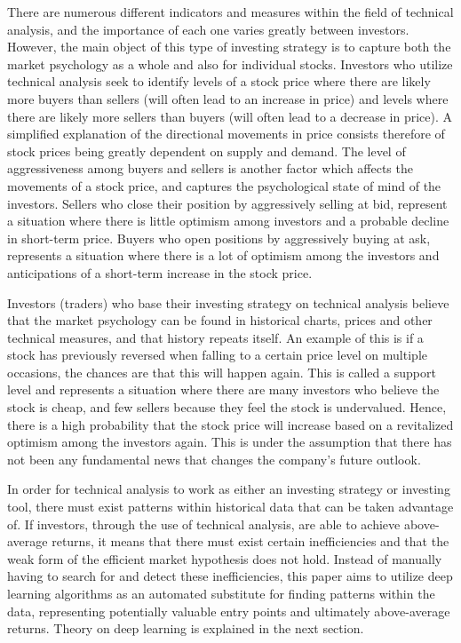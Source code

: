 \indent \newline 
There are numerous different indicators and measures within the field of technical analysis, and the importance of each one varies greatly between investors. However, the main object of this type of investing strategy is to capture both the market psychology as a whole and also for individual stocks. Investors who utilize technical analysis seek to identify levels of a stock price where there are likely more buyers than sellers (will often lead to an increase in price) and levels where there are likely more sellers than buyers (will often lead to a decrease in price). A simplified explanation of the directional movements in price consists therefore of stock prices being greatly dependent on supply and demand. The level of aggressiveness among buyers and sellers is another factor which affects the movements of a stock price, and captures the psychological state of mind of the investors. Sellers who close their position by aggressively selling at bid, represent a situation where there is little optimism among investors and a probable decline in short-term price. Buyers who open positions by aggressively buying at ask, represents a situation where there is a lot of optimism among the investors and anticipations of a short-term increase in the stock price. 

\indent \newline 
Investors (traders) who base their investing strategy on technical analysis believe that the market psychology can be found in historical charts, prices and other technical measures, and that history repeats itself. An example of this is if a stock has previously reversed when falling to a certain price level on multiple occasions, the chances are that this will happen again. This is called a support level and represents a situation where there are many investors who believe the stock is cheap, and few sellers because they feel the stock is undervalued. Hence, there is a high probability that the stock price will increase based on a revitalized optimism among the investors again. This is under the assumption that there has not been any fundamental news that changes the company's future outlook.    

\indent \newline 
In order for technical analysis to work as either an investing strategy or investing tool, there must exist patterns within historical data that can be taken advantage of. If investors, through the use of technical analysis, are able to achieve above-average returns, it means that there must exist certain inefficiencies and that the weak form of the efficient market hypothesis does not hold. Instead of manually having to search for and detect these inefficiencies, this paper aims to utilize deep learning algorithms as an automated substitute for finding patterns within the data, representing potentially valuable entry points and ultimately above-average returns. Theory on deep learning is explained in the next section.          

